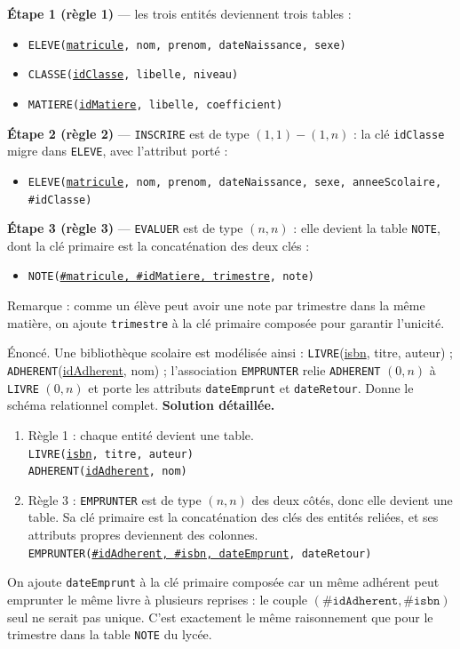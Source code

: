 \documentclass[11pt]{article}
\begin{document}
\begin{exemplebox}
\textbf{Étape 1 (règle 1)} — les trois entités deviennent trois tables :
\begin{itemize}
  \item \texttt{ELEVE(\underline{matricule}, nom, prenom, dateNaissance, sexe)}
  \item \texttt{CLASSE(\underline{idClasse}, libelle, niveau)}
  \item \texttt{MATIERE(\underline{idMatiere}, libelle, coefficient)}
\end{itemize}
\textbf{Étape 2 (règle 2)} — \texttt{INSCRIRE} est de type $(1,1)-(1,n)$ : la clé \texttt{idClasse} migre dans \texttt{ELEVE}, avec l'attribut porté :
\begin{itemize}
  \item \texttt{ELEVE(\underline{matricule}, nom, prenom, dateNaissance, sexe, anneeScolaire, \#idClasse)}
\end{itemize}
\textbf{Étape 3 (règle 3)} — \texttt{EVALUER} est de type $(n,n)$ : elle devient la table \texttt{NOTE}, dont la clé primaire est la concaténation des deux clés :
\begin{itemize}
  \item \texttt{NOTE(\underline{\#matricule, \#idMatiere, trimestre}, note)}
\end{itemize}
Remarque : comme un élève peut avoir une note par trimestre dans la même matière, on ajoute \texttt{trimestre} à la clé primaire composée pour garantir l'unicité.
\end{exemplebox}

\begin{exoresolu}
Énoncé. Une bibliothèque scolaire est modélisée ainsi : \texttt{LIVRE}(\underline{isbn}, titre, auteur) ; \texttt{ADHERENT}(\underline{idAdherent}, nom) ; l'association \texttt{EMPRUNTER} relie \texttt{ADHERENT} $(0,n)$ à \texttt{LIVRE} $(0,n)$ et porte les attributs \texttt{dateEmprunt} et \texttt{dateRetour}. Donne le schéma relationnel complet.
\tcblower
\textbf{Solution détaillée.}
\begin{enumerate}
  \item Règle 1 : chaque entité devient une table.\\
  \texttt{LIVRE(\underline{isbn}, titre, auteur)}\\
  \texttt{ADHERENT(\underline{idAdherent}, nom)}
  \item Règle 3 : \texttt{EMPRUNTER} est de type $(n,n)$ des deux côtés, donc elle devient une table. Sa clé primaire est la concaténation des clés des entités reliées, et ses attributs propres deviennent des colonnes.\\
  \texttt{EMPRUNTER(\underline{\#idAdherent, \#isbn, dateEmprunt}, dateRetour)}
\end{enumerate}
On ajoute \texttt{dateEmprunt} à la clé primaire composée car un même adhérent peut emprunter le même livre à plusieurs reprises : le couple $(\texttt{\#idAdherent}, \texttt{\#isbn})$ seul ne serait pas unique. C'est exactement le même raisonnement que pour le trimestre dans la table \texttt{NOTE} du lycée.
\end{exoresolu}
\end{document}
